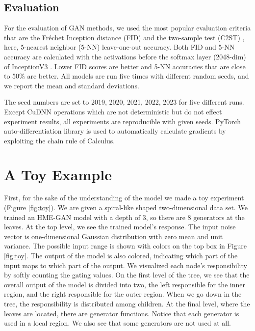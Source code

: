 \documentclass[a4paper,onesided,12pt]{report}
\begin{document}
\subsection{Evaluation}
\label{subsec:eval}
For the evaluation of GAN methods, we used the most popular evaluation criteria that are the Fr\'echet Inception distance (FID) \cite{heusel2017gans} and the two-sample test (C2ST) \cite{lopez2016revisiting}, here, 5-nearest neighbor (5-NN) leave-one-out accuracy. Both FID and 5-NN accuracy are calculated with the activations before the softmax layer (2048-dim) of InceptionV3 \cite{szegedy2016rethinking}. Lower FID scores are better and 5-NN accuracies that are close to 50\% are better. All models are run five times with different random seeds, and we report the mean and standard deviations.

The seed numbers are set to {2019, 2020, 2021, 2022, 2023} for five different runs. Except CuDNN \cite{chetlur2014cudnn} operations which are not deterministic but do not effect experiment results, all experiments are reproducible with given seeds. PyTorch auto-differentiation library \cite{paszke2017automatic} is used to automatically calculate gradients by exploiting the chain rule of Calculus.

\section{A Toy Example}
\label{sec:toy}
First, for the sake of the understanding of the model we made a toy experiment (Figure \ref{fig:toy}). We are given a spiral-like shaped two-dimensional data set. We trained an HME-GAN model with a depth of 3, so there are 8 generators at the leaves. At the top level, we see the trained model's response. The input noise vector is one-dimensional Gaussian distribution with zero mean and unit variance. The possible input range is shown with colors on the top box in Figure \ref{fig:toy}. The output of the model is also colored, indicating which part of the input maps to which part of the output. We visualized each node's responsibility by softly counting the gating values. On the first level of the tree, we see that the overall output of the model is divided into two, the left responsible for the inner region, and the right responsible for the outer region. When we go down in the tree, the responsibility is distributed among children. At the final level, where the leaves are located, there are generator functions. Notice that each generator is used in a local region. We also see that some generators are not used at all.
\end{document}
